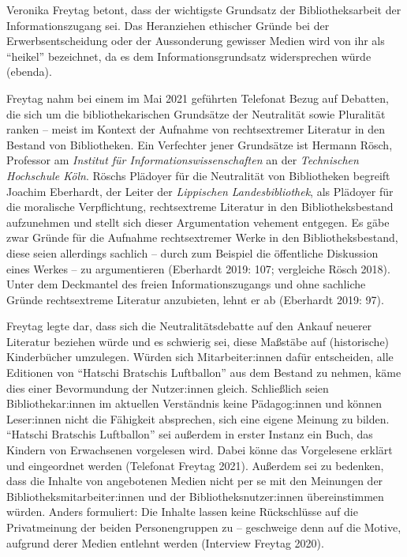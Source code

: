 \documentclass[a4paper,
fontsize=11pt,
oneside,
numbers=noperiodatend,
parskip=half-,
bibliography=totoc,
final
]{scrartcl}
\begin{document}
Veronika Freytag betont, dass der wichtigste Grundsatz der
Bibliotheksarbeit der Informationszugang sei. Das Heranziehen ethischer
Gründe bei der Erwerbsentscheidung oder der Aussonderung gewisser Medien
wird von ihr als \enquote{heikel} bezeichnet, da es dem Informationsgrundsatz
widersprechen würde (ebenda).

Freytag nahm bei einem im Mai 2021 geführten Telefonat Bezug auf
Debatten, die sich um die bibliothekarischen Grundsätze der Neutralität
sowie Pluralität ranken -- meist im Kontext der Aufnahme von
rechtsextremer Literatur in den Bestand von Bibliotheken. Ein Verfechter
jener Grundsätze ist Hermann Rösch, Professor am \emph{Institut für
Informationswissenschaften} an der \emph{Technischen Hochschule Köln}.
Röschs Plädoyer für die Neutralität von Bibliotheken begreift Joachim
Eberhardt, der Leiter der \emph{Lippischen Landesbibliothek}, als
Plädoyer für die moralische Verpflichtung, rechtsextreme Literatur in
den Bibliotheksbestand aufzunehmen und stellt sich dieser Argumentation
vehement entgegen. Es gäbe zwar Gründe für die Aufnahme rechtsextremer
Werke in den Bibliotheksbestand, diese seien allerdings sachlich --
durch zum Beispiel die öffentliche Diskussion eines Werkes -- zu
argumentieren (Eberhardt 2019: 107; vergleiche Rösch 2018). Unter dem
Deckmantel des freien Informationszugangs und ohne sachliche Gründe
rechtsextreme Literatur anzubieten, lehnt er ab (Eberhardt 2019: 97).

Freytag legte dar, dass sich die Neutralitätsdebatte auf den Ankauf
neuerer Literatur beziehen würde und es schwierig sei, diese Maßstäbe
auf (historische) Kinderbücher umzulegen. Würden sich Mitarbeiter:innen
dafür entscheiden, alle Editionen von \enquote{Hatschi Bratschis Luftballon}
aus dem Bestand zu nehmen, käme dies einer Bevormundung der Nutzer:innen
gleich. Schließlich seien Bibliothekar:innen im aktuellen Verständnis
keine Pädagog:innen und können Leser:innen nicht die Fähigkeit
absprechen, sich eine eigene Meinung zu bilden. \enquote{Hatschi Bratschis
Luftballon} sei außerdem in erster Instanz ein Buch, das Kindern von
Erwachsenen vorgelesen wird. Dabei könne das Vorgelesene erklärt und
eingeordnet werden (Telefonat Freytag 2021). Außerdem sei zu bedenken,
dass die Inhalte von angebotenen Medien nicht per se mit den Meinungen
der Bibliotheksmitarbeiter:innen und der Bibliotheksnutzer:innen
übereinstimmen würden. Anders formuliert: Die Inhalte lassen keine
Rückschlüsse auf die Privatmeinung der beiden Personengruppen zu --
geschweige denn auf die Motive, aufgrund derer Medien entlehnt werden
(Interview Freytag 2020).
\end{document}

